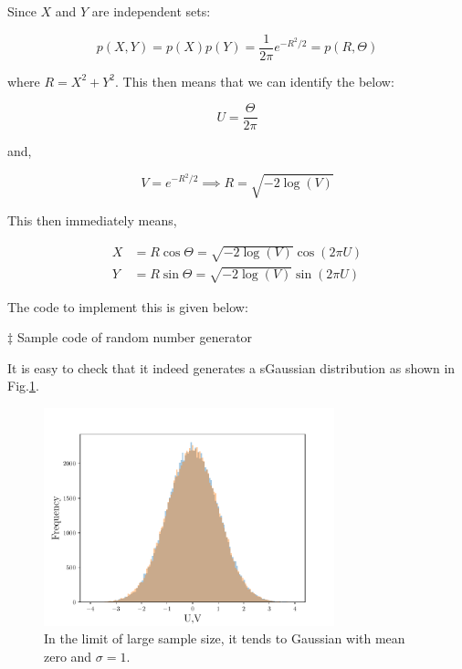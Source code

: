 \documentclass[11pt]{article}
\begin{document}
Since $X$ and $Y$ are independent sets:

\begin{equation}
	p(X,Y) = p(X) p(Y) = \frac{1}{2\pi} e^{-R^2/2} = p(R, \Theta) 
\end{equation}

where $R = X^2 + Y^2$. This then means that we can identify the below:

\begin{equation}
	U = \frac{\Theta}{2\pi} 
\end{equation}


and, 

\begin{equation}
	V = e^{-R^2/2} \implies R = \sqrt{-2 \log(V)} 
\end{equation}

This then immediately means, 

\begin{align}
	X &= R \cos \Theta = \sqrt{-2 \log(V)} \cos(2 \pi U) \\
	Y &= R \sin \Theta = \sqrt{-2 \log(V)} \sin(2 \pi U)
\end{align}

The code to implement this is given below: 

\vspace{10mm} 
\noindent $\ddagger$ Sample code of random number generator
\begin{mdframed}[backgroundcolor=cyan!1] 

\end{mdframed} 

It is easy to check that it indeed generates a 
sGaussian distribution as shown in Fig.\ref{fig:RN}. 


\begin{figure}[htbp] 
	\centering 
	\includegraphics[width=0.75\textwidth]{figs/testRN.pdf}
	\caption{\label{fig:RN}In the limit of large sample size, it tends to Gaussian with mean zero and $\sigma=1$.}
\end{figure}
\end{document}
